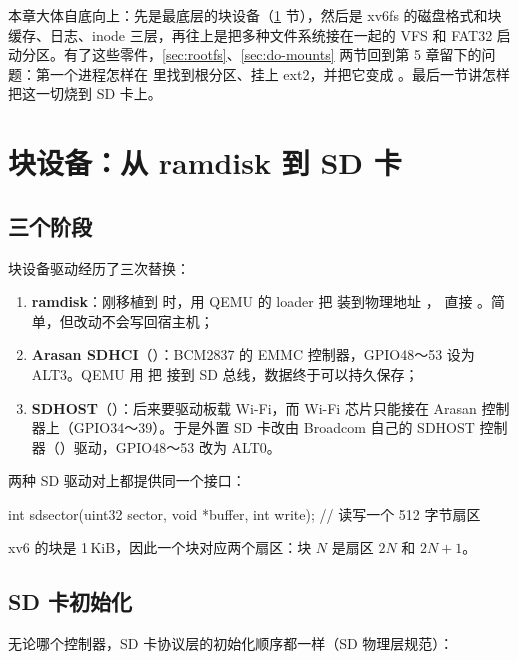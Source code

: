 本章大体自底向上：先是最底层的块设备（\ref{sec:blkdev-sd} 节），然后是 xv6fs 的磁盘格式和块缓存、日志、inode 三层，再往上是把多种文件系统接在一起的 VFS 和 FAT32 启动分区。有了这些零件，\ref{sec:rootfs}、\ref{sec:do-mounts} 两节回到第 5 章留下的问题：第一个进程怎样在  里找到根分区、挂上 ext2，并把它变成 \code{/}。最后一节讲怎样把这一切烧到 SD 卡上。

\section{块设备：从 ramdisk 到 SD 卡}
\label{sec:blkdev-sd}

\subsection{三个阶段}

块设备驱动经历了三次替换：

\begin{enumerate}
  \item \textbf{ramdisk}：刚移植到  时，用 QEMU 的 loader 把  装到物理地址 ， 直接 。简单，但改动不会写回宿主机；
  \item \textbf{Arasan SDHCI}（）：BCM2837 的 EMMC 控制器，GPIO48～53 设为 ALT3。QEMU 用  把  接到 SD 总线，数据终于可以持久保存；
  \item \textbf{SDHOST}（）：后来要驱动板载 Wi-Fi，而 Wi-Fi 芯片只能接在 Arasan 控制器上（GPIO34～39）。于是外置 SD 卡改由 Broadcom 自己的 SDHOST 控制器（）驱动，GPIO48～53 改为 ALT0。
\end{enumerate}

两种 SD 驱动对上都提供同一个接口：

\begin{ccode}
int sdsector(uint32 sector, void *buffer, int write);   // 读写一个 512 字节扇区
\end{ccode}

xv6 的块是 1\,KiB，因此一个块对应两个扇区：块 $N$ 是扇区 $2N$ 和 $2N+1$。

\subsection{SD 卡初始化}

无论哪个控制器，SD 卡协议层的初始化顺序都一样（SD 物理层规范\cite{sdspec}）：

